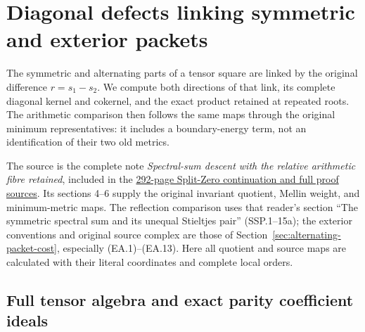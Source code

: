 \section{Diagonal defects linking symmetric and exterior packets}
\label{sec:diagonal-exterior-packets}

The symmetric and alternating parts of a tensor square are linked by the
original difference \(r=s_1-s_2\). We compute both directions of that link,
its complete diagonal kernel and cokernel, and the exact product retained
at repeated roots. The arithmetic comparison then follows the same maps
through the original minimum representatives: it includes a boundary-energy
term, not an identification of their two old metrics.

The source is the complete note \emph{Spectral-sum descent with the relative
arithmetic fibre retained}, included in the
\href{https://doi.org/10.5281/zenodo.22729194}{292-page Split-Zero continuation
and full proof sources}. Its sections 4--6 supply the original invariant
quotient, Mellin weight, and minimum-metric maps. The reflection comparison
uses that reader's section ``The symmetric spectral sum and its unequal
Stieltjes pair'' (SSP.1--15a); the exterior conventions and original
source complex are those of Section~\ref{sec:alternating-packet-cost},
especially (EA.1)--(EA.13).
Here all quotient and source maps are calculated with their literal
coordinates and complete local orders.

\subsection{Full tensor algebra and exact parity coefficient ideals}

